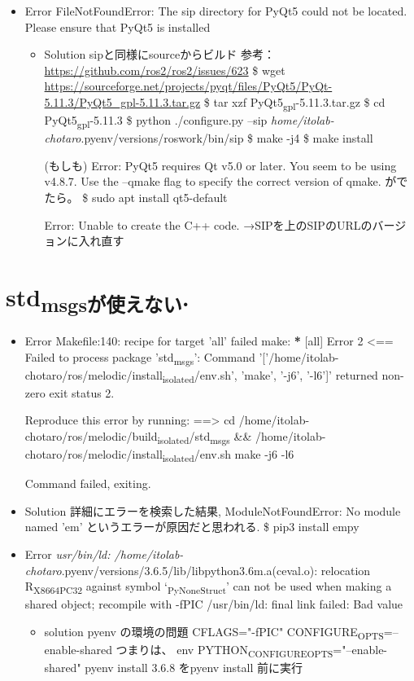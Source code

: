 \documentclass[11pt]{article}
\begin{document}
\begin{itemize}
\item Error
FileNotFoundError: The sip directory for PyQt5 could not be located. Please ensure that PyQt5 is installed

\begin{itemize}
\item Solution
sipと同様にsourceからビルド
参考： \url{https://github.com/ros2/ros2/issues/623}
\$ wget \url{https://sourceforge.net/projects/pyqt/files/PyQt5/PyQt-5.11.3/PyQt5\_gpl-5.11.3.tar.gz}
\$ tar xzf PyQt5\textsubscript{gpl}-5.11.3.tar.gz
\$ cd PyQt5\textsubscript{gpl}-5.11.3
\$ python ./configure.py --sip \emph{home/itolab-chotaro}.pyenv/versions/roswork/bin/sip
\$ make -j4
\$ make install

(もしも)
Error: PyQt5 requires Qt v5.0 or later. You seem to be using v4.8.7. Use the --qmake flag to specify the correct version of qmake.
がでたら。
\$ sudo apt install qt5-default

Error: Unable to create the C++ code.
→SIPを上のSIPのURLのバージョンに入れ直す
\end{itemize}
\end{itemize}


\section{std\textsubscript{msgsが使えない}.}
\label{sec:org7218c5a}
\begin{itemize}
\item Error
Makefile:140: recipe for target 'all' failed
make: \textbf{*} [all] Error 2
<== Failed to process package 'std\textsubscript{msgs}': 
  Command '['/home/itolab-chotaro/ros/melodic/install\textsubscript{isolated}/env.sh', 'make', '-j6', '-l6']' returned non-zero exit status 2.

Reproduce this error by running:
==> cd /home/itolab-chotaro/ros/melodic/build\textsubscript{isolated}/std\textsubscript{msgs} \&\& /home/itolab-chotaro/ros/melodic/install\textsubscript{isolated}/env.sh make -j6 -l6

Command failed, exiting.

\item Solution
詳細にエラーを検索した結果, ModuleNotFoundError: No module named 'em' というエラーが原因だと思われる.
\$ pip3 install empy

\item Error
\emph{usr/bin/ld: /home/itolab-chotaro}.pyenv/versions/3.6.5/lib/libpython3.6m.a(ceval.o): relocation R\textsubscript{X86}\textsubscript{64}\textsubscript{PC32} against symbol `\textsubscript{Py}\textsubscript{NoneStruct}' can not be used when making a shared object; recompile with -fPIC
/usr/bin/ld: final link failed: Bad value

\begin{itemize}
\item solution
pyenv の環境の問題
CFLAGS="-fPIC"
CONFIGURE\textsubscript{OPTS}=--enable-shared
つまりは、
env PYTHON\textsubscript{CONFIGURE}\textsubscript{OPTS}="--enable-shared" pyenv install 3.6.8
をpyenv install 前に実行
\end{itemize}
\end{itemize}
\end{document}
